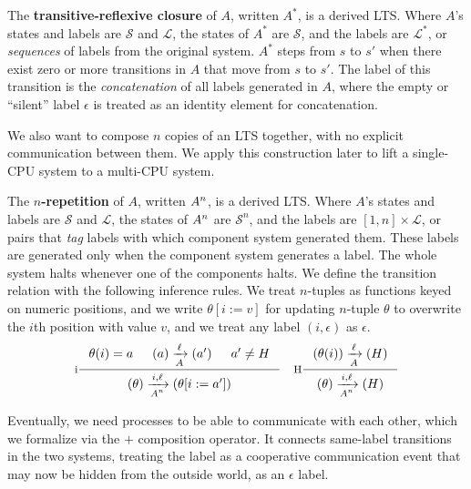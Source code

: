 \begin{defn}
The \textbf{transitive-reflexive closure} of $A$, written $A^{*}$, is a derived
LTS.  Where $A$'s states and labels are $\mathcal S$ and $\mathcal L$, the
states of $A^{*}$ are $\mathcal S$, and the labels are $\mathcal L^{*}$, or
\emph{sequences} of labels from the original system.  $A^{*}$ steps from $s$ to
$s'$ when there exist zero or more transitions in $A$ that move from $s$ to
$s'$.  The label of this transition is the \emph{concatenation} of all labels
generated in $A$, where the empty or ``silent'' label $\epsilon$ is treated as
an identity element for concatenation.
\end{defn}

We also want to compose $n$ copies of an LTS together, with no explicit
communication between them.  We apply this construction later to lift a
single-CPU system to a multi-CPU system.

\begin{defn}
The \textbf{$n$-repetition} of $A$, written $\smulti{n}{A}$, is a derived LTS.
Where $A$'s states and labels are $\mathcal S$ and $\mathcal L$, the states of
$\smulti{n}{A}$ are $\mathcal S^n$, and the labels are $[1, n] \times \mathcal
L$, or pairs that \emph{tag} labels with which component system generated them.
These labels are generated only when the component system generates a label.
The whole system halts whenever one of the components halts.  We define the
transition relation with the following inference rules. We treat $n$-tuples as
functions keyed on numeric positions, and we write $\theta[i := v]$ for
updating $n$-tuple $\theta$ to overwrite the $i$th position with value $v$, and
we treat any label $(i, \epsilon)$ as $\epsilon$.
$$\inference[i]
{\theta(i) = a & \io{$A$}{a}{a'}{\ell} & a' \neq H}
{\io{$\smulti{n}{A}$}{\theta}{\theta[i:=a']}{i,\ell}}
\quad \inference[H]
{\io{$A$}{\theta(i)}{H}{\ell}}
{\io{$\smulti{n}{A}$}{\theta}{H}{i,\ell}}
$$
\end{defn}

Eventually, we need processes to be able to communicate with each
other, which we formalize via the $+$ composition operator. It
connects same-label transitions in the two systems, treating the label
as a cooperative communication event that may now be hidden from the
outside world, as an $\epsilon$ label.


